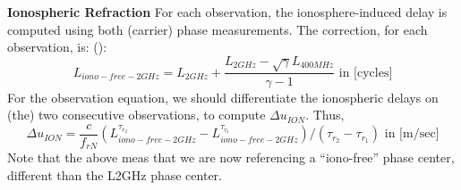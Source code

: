 \textbf{Ionospheric Refraction}
\label{ionospheric-refraction}
For each observation, the ionosphere-induced delay is computed using both 
(carrier) phase measurements. The correction, for each observation, is: 
(\cite{lemoine-2016}):
\begin{equation}
  L_{iono-free-2GHz} = L_{2GHz} 
    + \frac{L_{2GHz} - \sqrt \gamma L_{400MHz}}{\gamma - 1} 
    \text{ in [cycles]}
\end{equation}
For the observation equation, we should differentiate the ionospheric delays on 
(the) two consecutive observations, to compute $\Delta u_{ION}$. Thus,
\begin{equation}
  \Delta u_{ION} = \frac{c}{f_{rN}} \left( L_{iono-free-2GHz}^{\tau_{r_2}} 
    - L_{iono-free-2GHz}^{\tau_{r_1}} \right) / (\tau_{r_2} - \tau_{r_1})
    \text{ in [m/sec]}
\end{equation}
Note that the above meas that we are now referencing a ``iono-free'' phase center, 
different than the L2GHz phase center.

